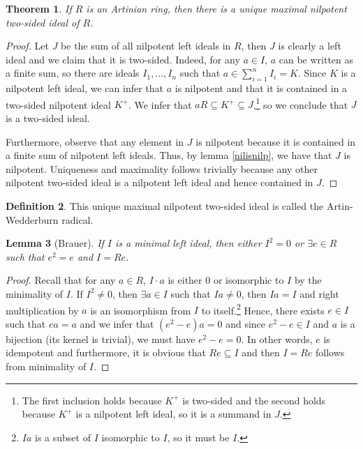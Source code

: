 \documentclass{tufte-handout} %
\newtheorem{thm}{Theorem}
\newtheorem{lem}[thm]{Lemma}
\theoremstyle{definition}
\newtheorem{defn}[thm]{Definition}
\theoremstyle{remark}
\begin{document}
\begin{thm}
	If $R$ is an Artinian ring, then there is a unique maximal nilpotent two-sided ideal of $R$.
\end{thm}
\begin{proof}
	Let $J$ be the sum of all nilpotent left ideals in $R$, then $J$ is clearly a left ideal and we claim that it is two-sided. Indeed, for any $a \in I$, $a$ can be written as a finite sum, so there are ideals $I_1, \dots, I_n$ such that $a \in \sum_{i=1}^n I_i = K$. Since $K$ is a nilpotent left ideal, we can infer that $a$ is nilpotent and that it is contained in a two-sided nilpotent ideal $K^{+}$. We infer that $aR \subseteq K^{+} \subseteq J$,\footnote{The first inclusion holds because $K^{+}$ is two-sided and the second holds because $K^{+}$ is a nilpotent left ideal, so it is a summand in $J$.} so we conclude that $J$ is a two-sided ideal.
	
	Furthermore, observe that any element in $J$ is nilpotent because it is contained in a finite sum of nilpotent left ideals. Thus, by lemma \ref{nilisnilp}, we have that $J$ is nilpotent. Uniqueness and maximality follows trivially because any other nilpotent two-sided ideal is a nilpotent left ideal and hence contained in $J$.
\end{proof}
\begin{defn}
	This unique maximal nilpotent two-sided ideal is called the Artin-Wedderburn radical.
\end{defn}

\begin{lem}[Brauer]
	If $I$ is a minimal left ideal, then either $I^2 = 0$ or $\exists e \in R$ such that $e^2 = e$ and $I = Re$.
\end{lem}
\begin{proof}
	Recall that for any $a \in R$, $I\cdot a$ is either $0$ or isomorphic to $I$ by the minimality of $I$. If $I^2 \neq 0$, then $\exists a \in I$ such that $Ia \neq 0$, then $Ia = I$ and right multiplication by $a$ is an isomorphism from $I$ to itself.\footnote{$Ia$ is a subset of $I$ isomorphic to $I$, so it must be $I$.} Hence, there exists $e \in I$ such that $ea = a$ and we infer that $(e^2-e)a = 0$ and since $e^2-e \in I$ and $a$ is a bijection (its kernel is trivial), we must have $e^2 -e = 0$. In other words, $e$ is idempotent and furthermore, it is obvious that $Re \subseteq I$ and then $I = Re$ follows from minimality of $I$.
\end{proof}
\end{document}
